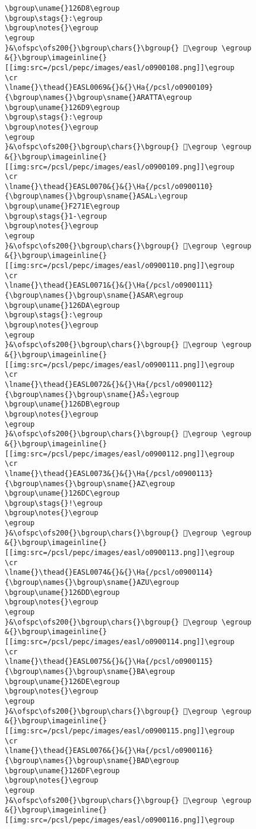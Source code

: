 \begin{verbatim}
\bgroup\uname{}126D8\egroup
\bgroup\stags{}:\egroup
\bgroup\notes{}\egroup
\egroup
}&\ofspc\ofs200{}\bgroup\chars{}\bgroup{} 𒛘\egroup \egroup
&{}\bgroup\imageinline{}[[img:src=/pcsl/pepc/images/easl/o0900108.png]]\egroup
\cr
\lname{}\thead{}EASL0069&{}&{}\Ha{/pcsl/o0900109}{\bgroup\names{}\bgroup\sname{}ARATTA\egroup
\bgroup\uname{}126D9\egroup
\bgroup\stags{}:\egroup
\bgroup\notes{}\egroup
\egroup
}&\ofspc\ofs200{}\bgroup\chars{}\bgroup{} 𒛙\egroup \egroup
&{}\bgroup\imageinline{}[[img:src=/pcsl/pepc/images/easl/o0900109.png]]\egroup
\cr
\lname{}\thead{}EASL0070&{}&{}\Ha{/pcsl/o0900110}{\bgroup\names{}\bgroup\sname{}ASAL₂\egroup
\bgroup\uname{}F271E\egroup
\bgroup\stags{}1-\egroup
\bgroup\notes{}\egroup
\egroup
}&\ofspc\ofs200{}\bgroup\chars{}\bgroup{} 󲜞\egroup \egroup
&{}\bgroup\imageinline{}[[img:src=/pcsl/pepc/images/easl/o0900110.png]]\egroup
\cr
\lname{}\thead{}EASL0071&{}&{}\Ha{/pcsl/o0900111}{\bgroup\names{}\bgroup\sname{}ASAR\egroup
\bgroup\uname{}126DA\egroup
\bgroup\stags{}:\egroup
\bgroup\notes{}\egroup
\egroup
}&\ofspc\ofs200{}\bgroup\chars{}\bgroup{} 𒛚\egroup \egroup
&{}\bgroup\imageinline{}[[img:src=/pcsl/pepc/images/easl/o0900111.png]]\egroup
\cr
\lname{}\thead{}EASL0072&{}&{}\Ha{/pcsl/o0900112}{\bgroup\names{}\bgroup\sname{}AŠ₂\egroup
\bgroup\uname{}126DB\egroup
\bgroup\notes{}\egroup
\egroup
}&\ofspc\ofs200{}\bgroup\chars{}\bgroup{} 𒛛\egroup \egroup
&{}\bgroup\imageinline{}[[img:src=/pcsl/pepc/images/easl/o0900112.png]]\egroup
\cr
\lname{}\thead{}EASL0073&{}&{}\Ha{/pcsl/o0900113}{\bgroup\names{}\bgroup\sname{}AZ\egroup
\bgroup\uname{}126DC\egroup
\bgroup\stags{}!\egroup
\bgroup\notes{}\egroup
\egroup
}&\ofspc\ofs200{}\bgroup\chars{}\bgroup{} 𒛜\egroup \egroup
&{}\bgroup\imageinline{}[[img:src=/pcsl/pepc/images/easl/o0900113.png]]\egroup
\cr
\lname{}\thead{}EASL0074&{}&{}\Ha{/pcsl/o0900114}{\bgroup\names{}\bgroup\sname{}AZU\egroup
\bgroup\uname{}126DD\egroup
\bgroup\notes{}\egroup
\egroup
}&\ofspc\ofs200{}\bgroup\chars{}\bgroup{} 𒛝\egroup \egroup
&{}\bgroup\imageinline{}[[img:src=/pcsl/pepc/images/easl/o0900114.png]]\egroup
\cr
\lname{}\thead{}EASL0075&{}&{}\Ha{/pcsl/o0900115}{\bgroup\names{}\bgroup\sname{}BA\egroup
\bgroup\uname{}126DE\egroup
\bgroup\notes{}\egroup
\egroup
}&\ofspc\ofs200{}\bgroup\chars{}\bgroup{} 𒛞\egroup \egroup
&{}\bgroup\imageinline{}[[img:src=/pcsl/pepc/images/easl/o0900115.png]]\egroup
\cr
\lname{}\thead{}EASL0076&{}&{}\Ha{/pcsl/o0900116}{\bgroup\names{}\bgroup\sname{}BAD\egroup
\bgroup\uname{}126DF\egroup
\bgroup\notes{}\egroup
\egroup
}&\ofspc\ofs200{}\bgroup\chars{}\bgroup{} 𒛟\egroup \egroup
&{}\bgroup\imageinline{}[[img:src=/pcsl/pepc/images/easl/o0900116.png]]\egroup

\end{verbatim}

